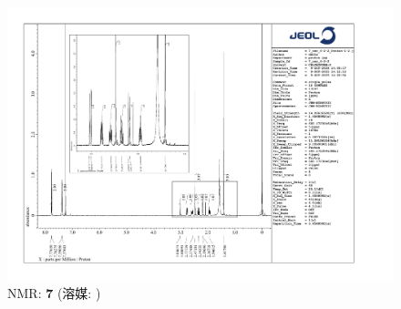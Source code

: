 \documentclass{ltjsarticle}
\theoremstyle{definition}
\numberwithin{equation}{section}
\begin{document}
\begin{figure}[htbp]
\begin{center}
\includegraphics[width = 15 cm]{NMR_6-2-2.pdf}
\caption{NMR: \textbf{7} (溶媒: )}
\label{NMR_6-2-2}
\end{center}
\end{figure}
\end{document}
